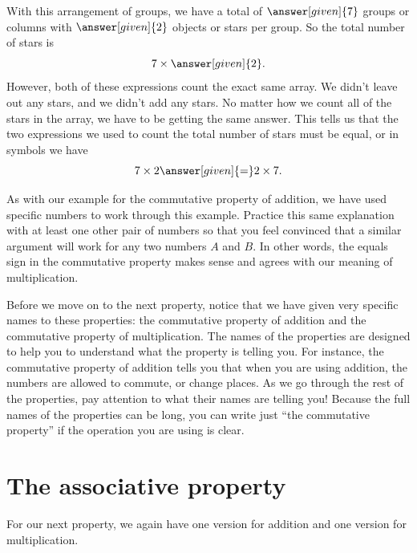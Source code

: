 \documentclass{ximera}
\begin{document}
\begin{example}
\begin{image} \end{image}
With this arrangement of groups, we have a total of $\answer[given]{7}$ groups or columns with $\answer[given]{2}$ objects or stars per group. So the total number of stars is 
\[
7 \times \answer[given]{2}.
\]
However, both of these expressions count the exact same array. We didn't leave out any stars, and we didn't add any stars. No matter how we count all of the stars in the array, we have to be getting the same answer. This tells us that the two expressions we used to count the total number of stars must be equal, or in symbols we have
\[
7 \times 2 \answer[given]{=} 2 \times 7.
\]
\end{example}

As with our example for the commutative property of addition, we have used specific numbers to work through this example. Practice this same explanation with at least one other pair of numbers so that you feel convinced that a similar argument will work for any two numbers $A$ and $B$. In other words, the equals sign in the commutative property makes sense and agrees with our meaning of multiplication.

Before we move on to the next property, notice that we have given very specific names to these properties: the commutative property of addition and the commutative property of multiplication. The names of the properties are designed to help you to understand what the property is telling you. For instance, the commutative property of addition tells you that when you are using addition, the numbers are allowed to commute, or change places. As we go through the rest of the properties, pay attention to what their names are telling you! Because the full names of the properties can be long, you can write just ``the commutative property'' if the operation you are using is clear.


\section{The associative property}

For our next property, we again have one version for addition and one version for multiplication.
\end{document}
